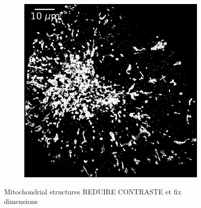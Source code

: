 \begin{figure}
\begin{subfigure}{0.49\textwidth}
        \includegraphics[width=\textwidth]{figures/mitochondria_image12.png}
        \caption{}
    \end{subfigure}
    \caption{Mitochondrial structures REDUIRE CONTRASTE et fix dimensions}
    \label{fig:extra_mitochondria_images}
\end{figure}

